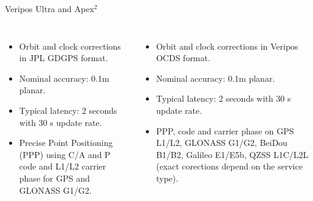 \documentclass[11pt]{beamer}
\begin{document}
\begin{frame}{Veripos Ultra and Apex$^2$} %
	\begin{columns}[T,onlytextwidth]
		\begin{itemize}	
			\item Orbit and clock corrections in JPL GDGPS format.
			\item Nominal accuracy: 0.1m planar. 
			\item Typical latency: 2 seconds with 30 s update rate.%
			\item Precise Point Positioning (PPP) using C/A and P code and L1/L2 carrier phase for GPS and GLONASS G1/G2.
		\end{itemize}	
			\begin{itemize}
			\item Orbit and clock corrections in Veripos OCDS format.
			\item Nominal accuracy: 0.1m planar. 
			\item Typical latency: 2 seconds with 30 s update rate.%
			\item PPP, code and carrier phase on GPS L1/L2, GLONASS G1/G2, BeiDou B1/B2, Galileo E1/E5b, QZSS L1C/L2L (exact corections depend on the service type).
			\end{itemize}	
	\end{columns}
\end{frame}
\end{document}
